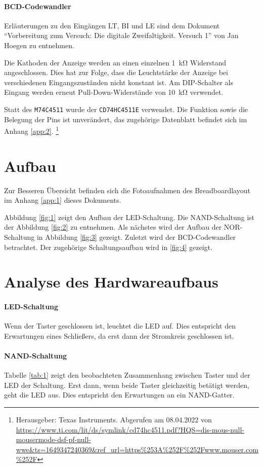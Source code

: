 \documentclass[
    paper=a4,
]{scrartcl}
\begin{document}
    \paragraph{BCD-Codewandler}
        Erläuterungen zu den Eingängen LT, BI und LE sind dem Dokument "`Vorbereitung zum Versuch: Die digitale Zweifaltigkeit. Versuch 1"' von Jan Hoegen zu entnehmen. 
        
        Die Kathoden der Anzeige werden an einen einzelnen \SI{1}{\kilo\ohm} Widerstand angeschlossen. Dies hat zur Folge, dass die Leuchtstärke der Anzeige bei verschiedenen Eingangszuständen nicht konstant ist. Am DIP-Schalter als Eingang werden erneut Pull-Down-Widerstände von \SI{10}{\kilo\ohm} verwendet.

        Statt des \texttt{M74C4511} wurde der \texttt{CD74HC4511E} verwendet. Die Funktion sowie die Belegung der Pins ist unverändert, das zugehörige Datenblatt befindet sich im Anhang \ref{app:2}.%
        \footnote{Herausgeber: Texas Instruments. Abgerufen am 08.04.2022 von \url{https://www.ti.com/lit/ds/symlink/cd74hc4511.pdf?HQS=dis-mous-null-mousermode-dsf-pf-null-wwe&ts=1649347240369&ref_url=https\%253A\%252F\%252Fwww.mouser.com\%252F}}

\section{Aufbau}
    \label{sec:1}
    Zur Besseren Übersicht befinden sich die Fotoaufnahmen des Breadboardlayout im Anhang \ref{app:1} dieses Dokuments.

    Abbildung \ref{fig:1} zeigt den Aufbau der LED-Schaltung. Die NAND-Schaltung ist der Abbildung \ref{fig:2} zu entnehmen. Als nächstes wird der Aufbau der NOR-Schaltung in Abbildung \ref{fig:3} gezeigt. Zuletzt wird der BCD-Codewandler betrachtet. Der zugehörige Schaltungsaufbau wird in \ref{fig:4} gezeigt. 

\section{Analyse des Hardwareaufbaus}
    \paragraph{LED-Schaltung} Wenn der Taster geschlossen ist, leuchtet die LED auf. Dies entspricht den Erwartungen eines Schließers, da erst dann der Stromkreis geschlossen ist.

    \paragraph{NAND-Schaltung} Tabelle \ref{tab:1} zeigt den beobachteten Zusammenhang zwischen Taster und der LED der Schaltung. Erst dann, wenn beide Taster gleichzeitig betätigt werden, geht die LED aus. Dies entspricht den Erwartungen an ein NAND-Gatter.
\end{document}
